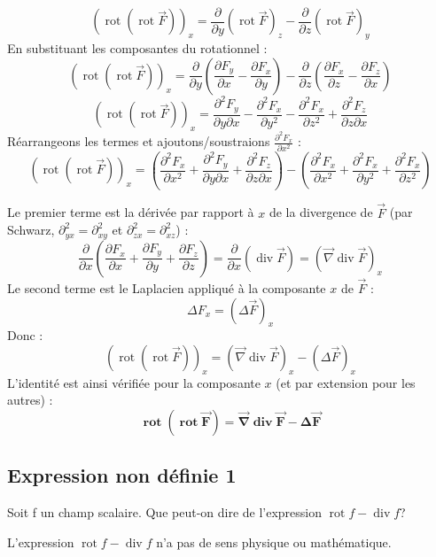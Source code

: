 \documentclass[french]{yLectureNote}
\renewcommand{\vec}{\overrightarrow}
\begin{document}
$$
(\operatorname{rot}(\operatorname{rot}\vec{F}))_x = \frac{\partial}{\partial y}(\operatorname{rot}\vec{F})_z - \frac{\partial}{\partial z}(\operatorname{rot}\vec{F})_y
$$
En substituant les composantes du rotationnel :
$$
(\operatorname{rot}(\operatorname{rot}\vec{F}))_x = \frac{\partial}{\partial y}\left(\frac{\partial F_y}{\partial x} - \frac{\partial F_x}{\partial y}\right) - \frac{\partial}{\partial z}\left(\frac{\partial F_x}{\partial z} - \frac{\partial F_z}{\partial x}\right)
$$
$$
(\operatorname{rot}(\operatorname{rot}\vec{F}))_x = \frac{\partial^{2} F_y}{\partial y \partial x} - \frac{\partial^{2} F_x}{\partial y^{2}} - \frac{\partial^{2} F_x}{\partial z^{2}} + \frac{\partial^{2} F_z}{\partial z \partial x}
$$
Réarrangeons les termes et ajoutons/soustraions $\frac{\partial^{2} F_x}{\partial x^{2}}$ :
$$
(\operatorname{rot}(\operatorname{rot}\vec{F}))_x = \left(\frac{\partial^{2} F_x}{\partial x^{2}} + \frac{\partial^{2} F_y}{\partial y \partial x} + \frac{\partial^{2} F_z}{\partial z \partial x}\right) - \left(\frac{\partial^{2} F_x}{\partial x^{2}} + \frac{\partial^{2} F_x}{\partial y^{2}} + \frac{\partial^{2} F_x}{\partial z^{2}}\right)
$$

Le premier terme est la dérivée par rapport à $x$ de la divergence de $\vec{F}$ (par Schwarz, $\partial_{yx}^2 = \partial_{xy}^2$ et $\partial_{zx}^2 = \partial_{xz}^2$) :
$$
\frac{\partial}{\partial x}\left(\frac{\partial F_x}{\partial x} + \frac{\partial F_y}{\partial y} + \frac{\partial F_z}{\partial z}\right) = \frac{\partial}{\partial x}(\operatorname{div}\vec{F}) = (\vec{\nabla}\operatorname{div}\vec{F})_x
$$
Le second terme est le Laplacien appliqué à la composante $x$ de $\vec{F}$ :
$$
\Delta F_x = (\Delta\vec{F})_x
$$
Donc :
$$
(\operatorname{rot}(\operatorname{rot}\vec{F}))_x = (\vec{\nabla}\operatorname{div}\vec{F})_x - (\Delta\vec{F})_x
$$
L'identité est ainsi vérifiée pour la composante $x$ (et par extension pour les autres) :
$$
\mathbf{\operatorname{rot}(\operatorname{rot}\vec{F}) = \vec{\nabla}\operatorname{div}\vec{F} - \Delta\vec{F}}
$$

\subsection{Expression non définie 1}

Soit f un champ scalaire. Que peut-on dire de l'expression $\operatorname{rot}f-\operatorname{div}f$?

L'expression $\operatorname{rot}f - \operatorname{div}f$ n'a pas de sens physique ou mathématique.
\end{document}
